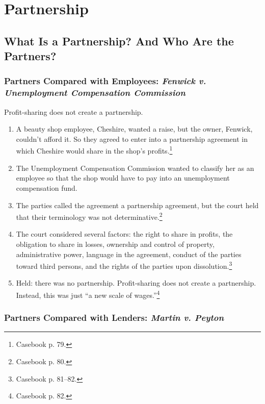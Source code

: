 \section{Partnership}

\subsection{What Is a Partnership? And Who Are the Partners?}

\subsubsection{Partners Compared with Employees: \emph{Fenwick v. Unemployment 
Compensation Commission}}

Profit-sharing does not create a partnership.

\begin{enumerate}
    \item A beauty shop employee, Cheshire, wanted a raise, but the owner, 
    Fenwick, couldn't afford it. So they agreed to enter into a partnership 
    agreement in which Cheshire would share in the shop's 
    profits.\footnote{Casebook p. 79.}
    \item The Unemployment Compensation Commission wanted to classify her as 
    an employee so that the shop would have to pay into an unemployment 
    compensation fund.
    \item The parties called the agreement a partnership agreement, but the 
    court held that their terminology was not determinative.\footnote{Casebook 
    p. 80.}
    \item The court considered several factors: the right to share in profits, 
    the obligation to share in losses, ownership and control of property, 
    administrative power, language in the agreement, conduct of the parties 
    toward third persons, and the rights of the parties upon 
    dissolution.\footnote{Casebook p. 81--82.}
    \item Held: there was no partnership. Profit-sharing does not create a 
    partnership. Instead, this was just ``a new scale of 
    wages.''\footnote{Casebook p. 82.}
\end{enumerate}

\subsubsection{Partners Compared with Lenders: \emph{Martin v. Peyton}}

